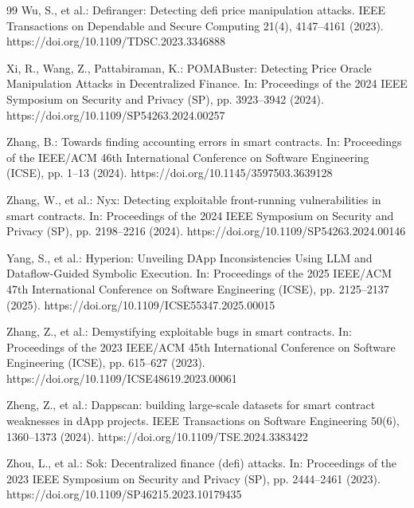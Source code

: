 \documentclass[pdflatex,sn-basic]{sn-jnl}%
\theoremstyle{thmstyleone}%
\theoremstyle{thmstyletwo}%
\theoremstyle{thmstylethree}%
\begin{document}
\begin{thebibliography}{99}
Wu, S., et al.: Defiranger: Detecting defi price manipulation attacks. IEEE Transactions on Dependable and Secure Computing 21(4), 4147--4161 (2023). https://doi.org/10.1109/TDSC.2023.3346888

Xi, R., Wang, Z., Pattabiraman, K.: POMABuster: Detecting Price Oracle Manipulation Attacks in Decentralized Finance. In: Proceedings of the 2024 IEEE Symposium on Security and Privacy (SP), pp. 3923--3942 (2024). https://doi.org/10.1109/SP54263.2024.00257

Zhang, B.: Towards finding accounting errors in smart contracts. In: Proceedings of the IEEE/ACM 46th International Conference on Software Engineering (ICSE), pp. 1--13 (2024). https://doi.org/10.1145/3597503.3639128

Zhang, W., et al.: Nyx: Detecting exploitable front-running vulnerabilities in smart contracts. In: Proceedings of the 2024 IEEE Symposium on Security and Privacy (SP), pp. 2198--2216 (2024). https://doi.org/10.1109/SP54263.2024.00146

Yang, S., et al.: Hyperion: Unveiling DApp Inconsistencies Using LLM and Dataflow-Guided Symbolic Execution. In: Proceedings of the 2025 IEEE/ACM 47th International Conference on Software Engineering (ICSE), pp. 2125--2137 (2025). https://doi.org/10.1109/ICSE55347.2025.00015

Zhang, Z., et al.: Demystifying exploitable bugs in smart contracts. In: Proceedings of the 2023 IEEE/ACM 45th International Conference on Software Engineering (ICSE), pp. 615--627 (2023). https://doi.org/10.1109/ICSE48619.2023.00061

Zheng, Z., et al.: Dappscan: building large-scale datasets for smart contract weaknesses in dApp projects. IEEE Transactions on Software Engineering 50(6), 1360--1373 (2024). https://doi.org/10.1109/TSE.2024.3383422

Zhou, L., et al.: Sok: Decentralized finance (defi) attacks. In: Proceedings of the 2023 IEEE Symposium on Security and Privacy (SP), pp. 2444--2461 (2023). https://doi.org/10.1109/SP46215.2023.10179435

\end{thebibliography}
\end{document}
